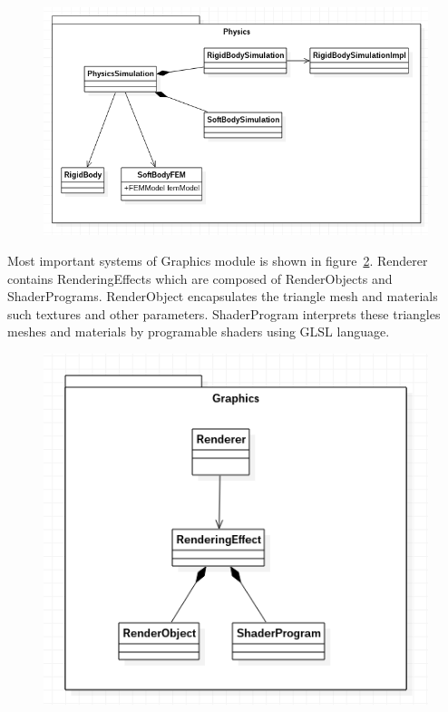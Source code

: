 \documentclass[en]{minipw} %
\begin{document}
\begin{figure}[h!]
\centering
\includegraphics[scale=0.5]{pictures/ifx_physics.png}
\caption[Logo MiNI]{}
\label{fig:ifx_physics}
\end{figure}

Most important systems of Graphics module is shown in figure~\ref{fig:ifx_graphics}. Renderer contains RenderingEffects which are composed of RenderObjects and ShaderPrograms. RenderObject encapsulates the triangle mesh and materials such textures and other parameters. ShaderProgram interprets these triangles meshes and materials by programable shaders using GLSL language.

\begin{figure}[h!]
\centering
\includegraphics[scale=0.5]{pictures/ifx_graphics.png}
\caption[Logo MiNI]{}
\label{fig:ifx_graphics}
\end{figure}
\end{document}
